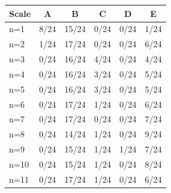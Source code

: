 \begin{tabular}{lccccc}
\toprule
Scale & \cellcolor[HTML]{FFFFFF} A & \cellcolor[HTML]{EA4646} B & \cellcolor[HTML]{9670BD} C & \cellcolor[HTML]{8FEB32} D & \cellcolor[HTML]{19C8C8} E \\
\midrule
n=1 & \cellcolor[HTML]{FFFFFF} 8/24 & \cellcolor[HTML]{EA4646} 15/24 & \cellcolor[HTML]{9670BD} 0/24 & \cellcolor[HTML]{8FEB32} 0/24 & \cellcolor[HTML]{19C8C8} 1/24 \\
n=2 & \cellcolor[HTML]{FFFFFF} 1/24 & \cellcolor[HTML]{EA4646} 17/24 & \cellcolor[HTML]{9670BD} 0/24 & \cellcolor[HTML]{8FEB32} 0/24 & \cellcolor[HTML]{19C8C8} 6/24 \\
n=3 & \cellcolor[HTML]{FFFFFF} 0/24 & \cellcolor[HTML]{EA4646} 16/24 & \cellcolor[HTML]{9670BD} 4/24 & \cellcolor[HTML]{8FEB32} 0/24 & \cellcolor[HTML]{19C8C8} 4/24 \\
n=4 & \cellcolor[HTML]{FFFFFF} 0/24 & \cellcolor[HTML]{EA4646} 16/24 & \cellcolor[HTML]{9670BD} 3/24 & \cellcolor[HTML]{8FEB32} 0/24 & \cellcolor[HTML]{19C8C8} 5/24 \\
n=5 & \cellcolor[HTML]{FFFFFF} 0/24 & \cellcolor[HTML]{EA4646} 16/24 & \cellcolor[HTML]{9670BD} 3/24 & \cellcolor[HTML]{8FEB32} 0/24 & \cellcolor[HTML]{19C8C8} 5/24 \\
n=6 & \cellcolor[HTML]{FFFFFF} 0/24 & \cellcolor[HTML]{EA4646} 17/24 & \cellcolor[HTML]{9670BD} 1/24 & \cellcolor[HTML]{8FEB32} 0/24 & \cellcolor[HTML]{19C8C8} 6/24 \\
n=7 & \cellcolor[HTML]{FFFFFF} 0/24 & \cellcolor[HTML]{EA4646} 17/24 & \cellcolor[HTML]{9670BD} 0/24 & \cellcolor[HTML]{8FEB32} 0/24 & \cellcolor[HTML]{19C8C8} 7/24 \\
n=8 & \cellcolor[HTML]{FFFFFF} 0/24 & \cellcolor[HTML]{EA4646} 14/24 & \cellcolor[HTML]{9670BD} 1/24 & \cellcolor[HTML]{8FEB32} 0/24 & \cellcolor[HTML]{19C8C8} 9/24 \\
n=9 & \cellcolor[HTML]{FFFFFF} 0/24 & \cellcolor[HTML]{EA4646} 15/24 & \cellcolor[HTML]{9670BD} 1/24 & \cellcolor[HTML]{8FEB32} 1/24 & \cellcolor[HTML]{19C8C8} 7/24 \\
n=10 & \cellcolor[HTML]{FFFFFF} 0/24 & \cellcolor[HTML]{EA4646} 15/24 & \cellcolor[HTML]{9670BD} 1/24 & \cellcolor[HTML]{8FEB32} 0/24 & \cellcolor[HTML]{19C8C8} 8/24 \\
n=11 & \cellcolor[HTML]{FFFFFF} 0/24 & \cellcolor[HTML]{EA4646} 17/24 & \cellcolor[HTML]{9670BD} 1/24 & \cellcolor[HTML]{8FEB32} 0/24 & \cellcolor[HTML]{19C8C8} 6/24 \\

\end{tabular}
